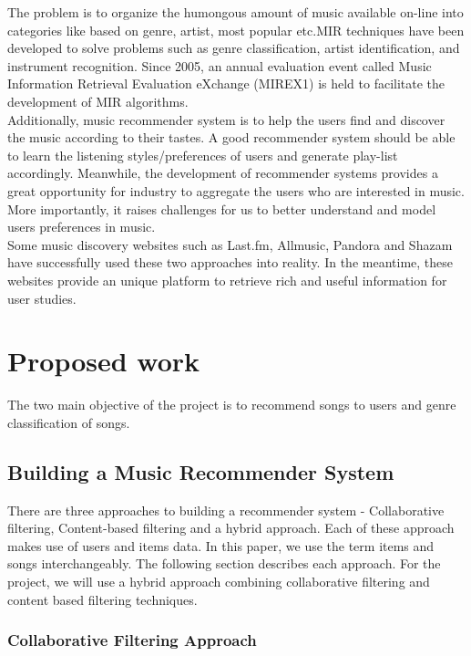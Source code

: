 \documentclass{sig-alternate-05-2015}
\begin{document}
The problem is to organize the humongous amount of music available on-line into categories like based on genre, artist, most popular etc.MIR  techniques  have  been  developed  to  solve problems  such  as  genre  classification,  artist  identification,  and  instrument recognition. Since 2005, an annual evaluation event called Music Information Retrieval Evaluation eXchange (MIREX1) is held to facilitate the development of MIR algorithms\cite{DeepContentbased}.\\

Additionally, music recommender system is to help the users find and discover the music according to their tastes. A good recommender system should be able to learn the listening styles/preferences of users and generate play-list accordingly. Meanwhile, the development of recommender systems provides a great opportunity for industry  to  aggregate  the  users  who  are  interested  in  music.  More  importantly, it raises challenges for us to better understand and model users preferences in music.\\

Some music discovery websites such as Last.fm, Allmusic, Pandora and Shazam have successfully used these two approaches into reality. In the meantime, these websites provide an unique platform to retrieve rich and useful information for user studies.\\

\section{Proposed work}
The two main objective of the project is to recommend songs to users and genre classification of songs.

\subsection{Building a Music Recommender System}

There are three approaches to building a recommender system - Collaborative filtering, Content-based filtering and a hybrid approach. Each of these approach makes use of users and items data. In this paper, we use the term items and songs interchangeably. The following section describes each approach. For the project, we will use a hybrid approach combining collaborative filtering and content based filtering techniques.

\subsubsection{Collaborative Filtering Approach}
\end{document}
